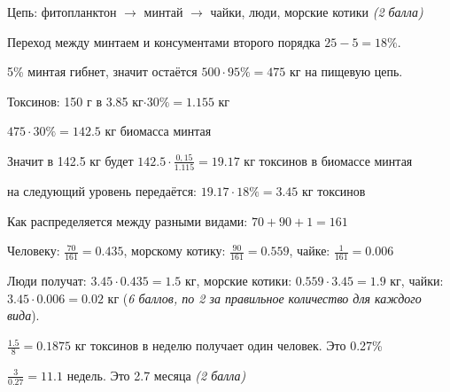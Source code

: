 \solutionSection

Цепь: фитопланктон $\to$ минтай $\rightarrow$ чайки, люди, морские котики \textit{(2 балла)}

Переход между минтаем и консументами второго порядка $25-5=18\%$.

5\% минтая гибнет, значит остаётся $500\cdot95\% = 475$ кг на пищевую цепь.

Токсинов: 150 г в 3.85 кг$\cdot30\% = 1.155$ кг

$475\cdot30\%=142.5$ кг биомасса минтая

Значит в 142.5 кг будет $142.5\cdot\frac{0,15}{1.115} = 19.17$ кг токсинов в биомассе минтая

на следующий уровень передаётся: $19.17\cdot18\% = 3.45$ кг токсинов

Как распределяется между разными видами: $70+90+1 = 161$

Человеку: $\frac{70}{161}=0.435$, морскому котику: $\frac{90}{161}=0.559$, чайке: $\frac{1}{161}=0.006$

Люди получат: $3.45\cdot0.435 = 1.5$ кг, морские котики: $0.559\cdot3.45 = 1.9$ кг, чайки: $3.45\cdot0.006 = 0.02$ кг (\textit{6 баллов, по 2 за правильное количество для каждого вида}).

$\frac{1.5}{8} = 0.1875$ кг токсинов в неделю получает один человек. Это 0.27\%

$\frac{3}{0.27} = 11.1$ недель. Это 2.7 месяца \textit{(2 балла)}